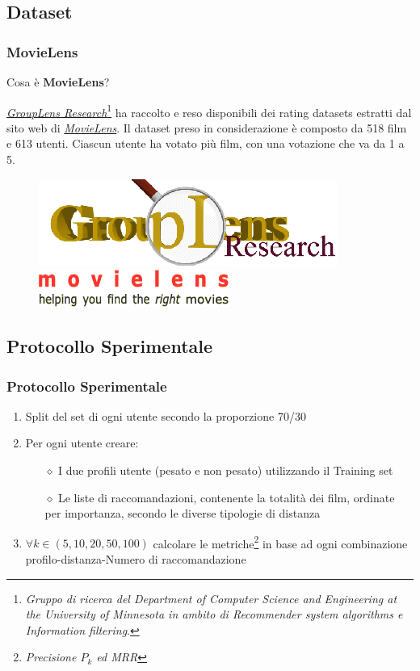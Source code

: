 \documentclass{beamer}
\begin{document}
\subsection{Dataset}
\begin{frame}
\frametitle{MovieLens}
Cosa è \textbf{MovieLens}? \\ \vspace{0.5cm}

\href{http://www.grouplens.org/}{\emph{GroupLens Research}}\footnote{\tiny \emph{Gruppo di ricerca del Department of Computer Science and Engineering at the University of Minnesota in ambito di Recommender system algorithms e Information filtering}.} ha raccolto e reso disponibili dei rating datasets estratti dal sito web di \href{http://movielens.umn.edu}{\emph{MovieLens}}.
Il dataset preso in considerazione è composto da 518 film e 613 utenti. Ciascun utente ha votato più film, con una votazione che va da 1 a 5. 
\begin{figure}
	\includegraphics[width=.3\textwidth]{figure/gl-logo} ~~~~ 
	\includegraphics[width=.3\textwidth]{figure/movielens-helping}
\end{figure}
\end{frame}

\subsection{Protocollo Sperimentale}


\begin{frame}
\frametitle{Protocollo Sperimentale}
\begin{enumerate}
	\setlength{\itemsep}{10pt}
	\item<1-> Split del set di ogni utente secondo la proporzione 70/30
	\item<2-> Per ogni utente creare:
	\begin{itemize}
		\setlength{\itemsep}{6pt}
		\item[$\diamond$] I due profili utente (pesato e non pesato) utilizzando il Training set
		\item[$\diamond$] Le liste di raccomandazioni, contenente la totalità dei film, ordinate per importanza, secondo le diverse tipologie di distanza
	\end{itemize}
	\item<3-> $\forall k \in (5,10,20,50,100)$ calcolare le metriche\footnote{\emph{Precisione $P_k$ ed MRR}} in base ad ogni combinazione profilo-distanza-Numero di raccomandazione
\end{enumerate}
\end{frame}
\end{document}
